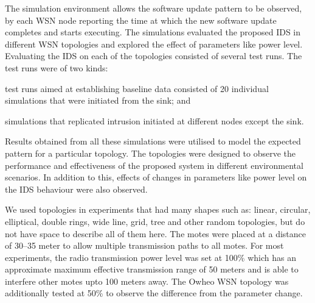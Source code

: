 \documentclass[conference]{IEEEtran}
\newcommand{\notedme}[1]{\raisebox{0pt}[0pt][0pt]{\pdfcomment[open=true,color=blue]{#1}}}
\begin{document}

The simulation environment allows the software update pattern to be observed, by each WSN node reporting the time at which the new software update completes and starts executing.
The simulations evaluated the proposed IDS in different WSN topologies and explored the effect of parameters like power level.
Evaluating the IDS on each of the topologies consisted of several test runs.
The test runs were of two kinds: 
\begin{inparaenum}
\item test runs aimed at establishing baseline data consisted of 20 individual simulations that were initiated from the sink; and
\item simulations that replicated intrusion initiated at different nodes except the sink.
\end{inparaenum}
Results obtained from all these simulations were utilised to model the expected pattern for a particular topology.
%
The topologies were designed to observe the performance and effectiveness %
of the proposed system in different environmental scenarios. 
In addition to this, effects of changes in parameters like power level on the IDS behaviour were also observed.


We used topologies in experiments that had many shapes such as: linear, circular, elliptical, double rings, wide line, grid, tree and other random topologies, but do not have space to describe all of them here.
The motes were placed at a distance of 30--35 meter to allow  multiple transmission paths to all motes. %
For most experiments, the radio transmission power level was set at 100\% which has an approximate maximum effective transmission range of 50 meters and is able to interfere other motes upto 100 meters away.
The Owheo WSN topology was additionally tested at 50\%  to %
observe the difference from the parameter change.
\end{document}
